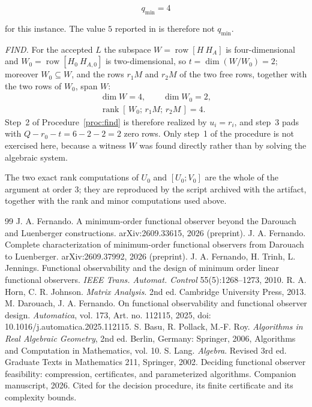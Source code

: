 ﻿\documentclass[journal]{IEEEtran}
\theoremstyle{plainn}
\theoremstyle{remark}
\begin{document}
\begin{equation*}
q_{\min}=4
\end{equation*}

for this instance. The value $5$ reported in \cite[Sec.~VII]{fer26b} is therefore not $q_{\min}$.

\emph{FIND.} For the accepted $L$ the subspace $W=\operatorname{row}[H\ H_A]$ is four-dimensional and
$W_0=\operatorname{row}[H_0\ H_{A,0}]$ is two-dimensional, so $t=\dim(W/W_0)=2$; moreover $W_0\subseteq
W$, and the rows $r_1M$ and $r_2M$ of the two free rows, together with the two rows of $W_0$, span
$W$:
\begin{equation*}
\begin{gathered}
\dim W=4,\qquad \dim W_0=2,\\
\operatorname{rank}[\,W_0;\,r_1M;\,r_2M\,]=4 .
\end{gathered}
\end{equation*}
Step~2 of Procedure~\ref{proc:find} is therefore realized by $u_i=r_i$, and step~3 pads with
$Q-r_0-t=6-2-2=2$ zero rows. Only step~1 of the procedure is not exercised here, because a witness
$W$ was found directly rather than by solving the algebraic system.

The two exact rank computations of $U_0$ and $[U_0;V_0]$ are the whole of the argument at order
$3$; they are reproduced by the script archived with the artifact, together with the rank and
minor computations used above.

\begin{thebibliography}{99}
 J. A. Fernando. A minimum-order functional observer beyond the Darouach and Luenberger constructions. arXiv:2609.33615, 2026 (preprint).
 J. A. Fernando. Complete characterization of minimum-order functional observers from Darouach to Luenberger. arXiv:2609.37992, 2026 (preprint).
 J. A. Fernando, H. Trinh, L. Jennings. Functional observability and the design of minimum order linear functional observers. \emph{IEEE Trans. Automat. Control} 55(5):1268--1273, 2010.
 R. A. Horn, C. R. Johnson. \emph{Matrix Analysis}. 2nd ed.
Cambridge University Press, 2013.
 M. Darouach, J. A. Fernando. On functional observability and functional observer design. \emph{Automatica}, vol. 173, Art. no. 112115, 2025, doi: 10.1016/j.automatica.2025.112115.
 S. Basu, R. Pollack, M.-F. Roy. \emph{Algorithms in Real
  Algebraic Geometry}, 2nd ed. Berlin, Germany: Springer, 2006,
  Algorithms and Computation in Mathematics, vol. 10.
 S. Lang. \emph{Algebra}. Revised 3rd ed.
Graduate Texts in Mathematics 211, Springer, 2002.
 Deciding functional observer feasibility: compression, certificates, and
parameterized algorithms. Companion manuscript, 2026. Cited for the decision procedure, its
finite certificate and its complexity bounds.
\end{thebibliography}
\end{document}
